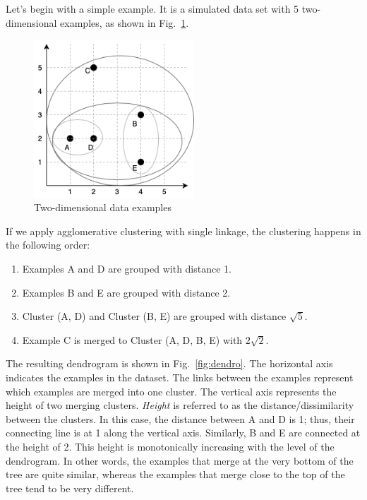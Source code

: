 Let's begin with a simple example. It is a simulated data set with 5 two-dimensional examples, as shown in Fig.~\ref{fig:data}. 

\begin{figure}[htp]
\centering
\captionsetup{justification=centering}
\includegraphics[width=6cm]{"Part 3 - Learning Systems/Unsupervised Learning/Hierarchical Clustering/figures/Dendrogram-Data.png"}
\caption{Two-dimensional data examples}
\label{fig:data}
\end{figure}

If we apply agglomerative clustering with single linkage, the clustering happens in the following order:
\begin{enumerate}
\item Examples A and D are grouped with distance 1. 
\item Examples B and E are grouped with distance 2. 
\item Cluster (A, D) and Cluster (B, E) are grouped with distance $\sqrt{5}$. 
\item Example C is merged to Cluster (A, D, B, E) with $2\sqrt{2}$. 
\end{enumerate}

The resulting dendrogram is shown in Fig.~\ref{fig:dendro}. The horizontal axis indicates the examples in the dataset. The links between the examples represent which examples are merged into one cluster. The vertical axis represents the height of two merging clusters. \textit{Height} is referred to as the distance/dissimilarity between the clusters. In this case, the distance between A and D is 1; thus, their connecting line is at 1 along the vertical axis. Similarly, B and E are connected at the height of 2. This height is monotonically increasing with the level of the dendrogram. In other words, the examples that merge at the very bottom of the tree are quite similar, whereas the examples that merge close to the top of the tree tend to be very different. 

